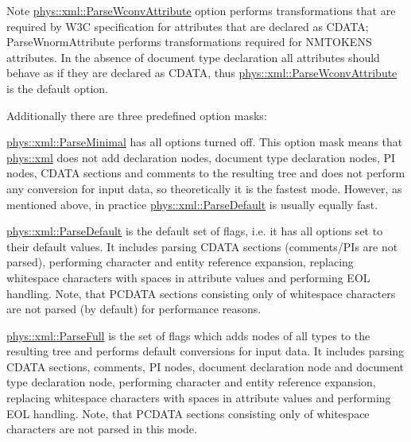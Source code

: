 \begin{DoxyNote}{Note}
\hyperlink{namespacephys_1_1xml_af9f7575e3cb8a0d8ad9a7ceee5e26983}{phys::xml::ParseWconvAttribute} option performs transformations that are required by W3C specification for attributes that are declared as CDATA; ParseWnormAttribute performs transformations required for NMTOKENS attributes. In the absence of document type declaration all attributes should behave as if they are declared as CDATA, thus \hyperlink{namespacephys_1_1xml_af9f7575e3cb8a0d8ad9a7ceee5e26983}{phys::xml::ParseWconvAttribute} is the default option.
\end{DoxyNote}
Additionally there are three predefined option masks:
\begin{DoxyItemize}
\item \hyperlink{namespacephys_1_1xml_ab660837afbc6aaab22425d8d23e8f2e4}{phys::xml::ParseMinimal} has all options turned off. This option mask means that \hyperlink{namespacephys_1_1xml}{phys::xml} does not add declaration nodes, document type declaration nodes, PI nodes, CDATA sections and comments to the resulting tree and does not perform any conversion for input data, so theoretically it is the fastest mode. However, as mentioned above, in practice \hyperlink{namespacephys_1_1xml_aa6b8f7f8c2322fd683a235b498834d60}{phys::xml::ParseDefault} is usually equally fast.
\item \hyperlink{namespacephys_1_1xml_aa6b8f7f8c2322fd683a235b498834d60}{phys::xml::ParseDefault} is the default set of flags, i.e. it has all options set to their default values. It includes parsing CDATA sections (comments/PIs are not parsed), performing character and entity reference expansion, replacing whitespace characters with spaces in attribute values and performing EOL handling. Note, that PCDATA sections consisting only of whitespace characters are not parsed (by default) for performance reasons.
\item \hyperlink{namespacephys_1_1xml_af1c356f1eb063a63efebd6c8a5241c63}{phys::xml::ParseFull} is the set of flags which adds nodes of all types to the resulting tree and performs default conversions for input data. It includes parsing CDATA sections, comments, PI nodes, document declaration node and document type declaration node, performing character and entity reference expansion, replacing whitespace characters with spaces in attribute values and performing EOL handling. Note, that PCDATA sections consisting only of whitespace characters are not parsed in this mode.
\end{DoxyItemize}

